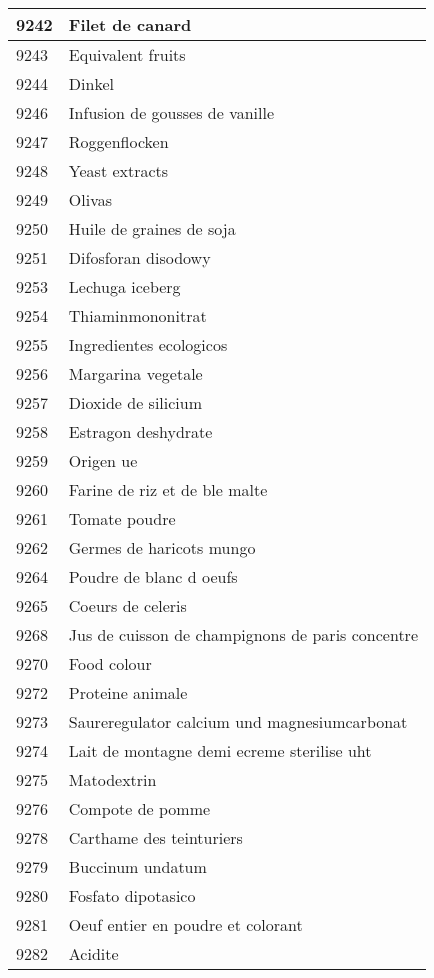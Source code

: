 \begin{longtable}{|l|l|}
9242 & Filet de canard \\ \hline 
9243 & Equivalent fruits \\ \hline 
9244 & Dinkel \\ \hline 
9246 & Infusion de gousses de vanille \\ \hline 
9247 & Roggenflocken \\ \hline 
9248 & Yeast extracts \\ \hline 
9249 & Olivas \\ \hline 
9250 & Huile de graines de soja \\ \hline 
9251 & Difosforan disodowy \\ \hline 
9253 & Lechuga iceberg \\ \hline 
9254 & Thiaminmononitrat \\ \hline 
9255 & Ingredientes ecologicos \\ \hline 
9256 & Margarina vegetale \\ \hline 
9257 & Dioxide de silicium \\ \hline 
9258 & Estragon deshydrate \\ \hline 
9259 & Origen ue \\ \hline 
9260 & Farine de riz et de ble malte \\ \hline 
9261 & Tomate poudre \\ \hline 
9262 & Germes de haricots mungo \\ \hline 
9264 & Poudre de blanc d oeufs \\ \hline 
9265 & Coeurs de celeris \\ \hline 
9268 & Jus de cuisson de champignons de paris concentre \\ \hline 
9270 & Food colour \\ \hline 
9272 & Proteine animale \\ \hline 
9273 & Saureregulator calcium und magnesiumcarbonat \\ \hline 
9274 & Lait de montagne demi ecreme sterilise uht \\ \hline 
9275 & Matodextrin \\ \hline 
9276 & Compote de pomme \\ \hline 
9278 & Carthame des teinturiers \\ \hline 
9279 & Buccinum undatum \\ \hline 
9280 & Fosfato dipotasico \\ \hline 
9281 & Oeuf entier en poudre et colorant \\ \hline 
9282 & Acidite \\ \hline 

\end{longtable}
